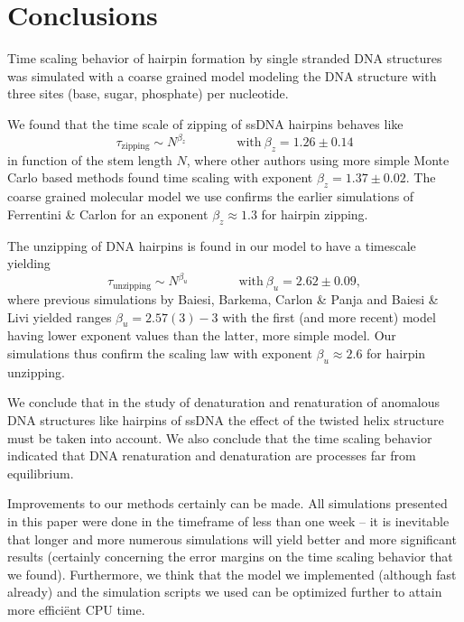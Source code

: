 \section{Conclusions}

Time scaling behavior of hairpin formation by single stranded DNA structures was simulated with a coarse grained model modeling the DNA structure with three sites (base, sugar, phosphate) per nucleotide.

We found that the time scale of zipping of ssDNA hairpins behaves like
\begin{equation}
\tau_\text{zipping} \sim N^{\beta_z} \qquad \qquad \text{with}\ \beta_z = 1.26\pm0.14
\end{equation}
in function of the stem length $N$, where other authors using more simple Monte Carlo based methods found time scaling with exponent $\beta_z = 1.37 \pm 0.02$. The coarse grained molecular model we use confirms the earlier simulations of Ferrentini \& Carlon \cite{carlon2011anomalous} for an exponent $\beta_z \approx 1.3$ for hairpin zipping.

The unzipping of DNA hairpins is found in our model to have a timescale yielding
\begin{equation}
\tau_\text{unzipping} \sim N^{\beta_u} \qquad \qquad \text{with}\ \beta_u = 2.62\pm0.09,
\end{equation}
where previous simulations by Baiesi, Barkema, Carlon \& Panja \cite{carlon2010unwinding} and Baiesi \& Livi \cite{baiesi2009multiple} yielded ranges $\beta_u = 2.57(3) - 3$ with the first (and more recent) model having lower exponent values than the latter, more simple model. Our simulations thus confirm the scaling law with exponent $\beta_u \approx 2.6$ for hairpin unzipping.

We conclude that in the study of denaturation and renaturation of anomalous DNA structures like hairpins of ssDNA the effect of the twisted helix structure must be taken into account. We also conclude that the time scaling behavior indicated that DNA renaturation and denaturation are processes far from equilibrium.

Improvements to our methods certainly can be made. All simulations presented in this paper were done in the timeframe of less than one week -- it is inevitable that longer and more numerous simulations will yield better and more significant results (certainly concerning the error margins on the time scaling behavior that we found). Furthermore, we think that the model we implemented (although fast already) and the simulation scripts we used can be optimized further to attain more effici\"ent CPU time.